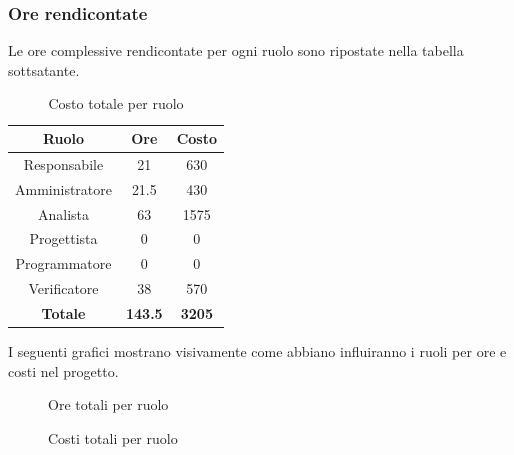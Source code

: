 \subsubsection{Ore rendicontate}
Le ore complessive rendicontate per ogni ruolo sono ripostate nella tabella sottsatante.
\begin{table}[H]
	\centering
	\begin{tabular}{|c|c|c|}
		\hline
		\textbf{Ruolo} &
		\textbf{Ore} &
		\textbf{Costo} \\
		\hline
		Responsabile & 21 & 630\\
		\hline
		Amministratore & 21.5 & 430\\
		\hline
		Analista & 63 & 1575\\
		\hline
		Progettista & 0 & 0 \\
		\hline
		Programmatore & 0 & 0 \\
		\hline
		Verificatore & 38 & 570\\
		\hline
		\textbf{Totale} & \textbf{143.5} & \textbf{3205} \\
		\hline
	\end{tabular}
	\caption{Costo totale per ruolo}
\end{table}
I seguenti grafici mostrano visivamente come abbiano influiranno i ruoli per ore e costi nel progetto.
\begin{figure}[H]
	\centering
	\caption{Ore totali per ruolo}
\end{figure}
\begin{figure}[H]
	\centering
	\caption{Costi totali per ruolo}
\end{figure}





